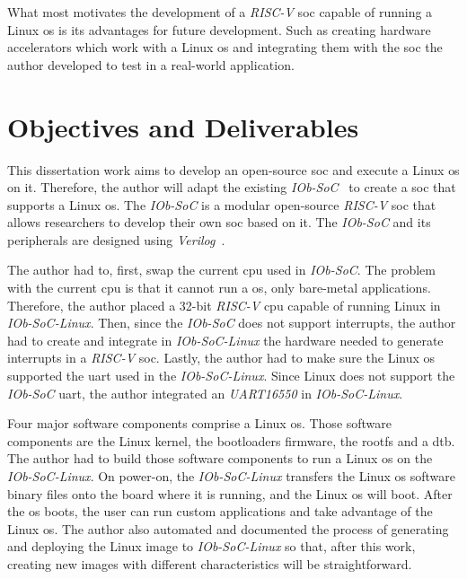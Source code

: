 What most motivates the development of a \textit{RISC-V} \acrshort{soc} capable of running a Linux \acrshort{os} is its advantages for future development. Such as creating hardware accelerators which work with a Linux \acrshort{os} and integrating them with the \acrshort{soc} the author developed to test in a real-world application.

\section{Objectives and Deliverables}
\label{section:objectives}
This dissertation work aims to develop an open-source \acrshort{soc} and execute a Linux \acrshort{os} on it. Therefore, the author will adapt the existing \textit{IOb-SoC}~\cite{iob_soc} to create a \acrshort{soc} that supports a Linux \acrshort{os}. The \textit{IOb-SoC} is a modular open-source \textit{RISC-V} \acrshort{soc} that allows researchers to develop their own \acrshort{soc} based on it. The \textit{IOb-SoC} and its peripherals are designed using \textit{Verilog}~\cite{thomas2008verilog}.

The author had to, first, swap the current \acrshort{cpu} used in \textit{IOb-SoC}. The problem with the current \acrshort{cpu} is that it cannot run a \acrshort{os}, only bare-metal applications. Therefore, the author placed a 32-bit \textit{RISC-V} \acrshort{cpu} capable of running Linux in \textit{IOb-SoC-Linux}. Then, since the \textit{IOb-SoC} does not support interrupts, the author had to create and integrate in \textit{IOb-SoC-Linux} the hardware needed to generate interrupts in a \textit{RISC-V} \acrshort{soc}. Lastly, the author had to make sure the Linux \acrshort{os} supported the \acrshort{uart} used in the \textit{IOb-SoC-Linux}. Since Linux does not support the \textit{IOb-SoC} \acrshort{uart}, the author integrated an \textit{UART16550} in \textit{IOb-SoC-Linux}.

Four major software components comprise a Linux \acrshort{os}. Those software components are the Linux kernel, the bootloaders firmware, the \acrfull{rootfs} and a \acrfull{dtb}. The author had to build those software components to run a Linux \acrshort{os} on the \textit{IOb-SoC-Linux}. On power-on, the \textit{IOb-SoC-Linux} transfers the Linux \acrshort{os} software binary files onto the board where it is running, and the Linux \acrshort{os} will boot. After the \acrshort{os} boots, the user can run custom applications and take advantage of the Linux \acrshort{os}. The author also automated and documented the process of generating and deploying the Linux image to \textit{IOb-SoC-Linux} so that, after this work, creating new images with different characteristics will be straightforward.

